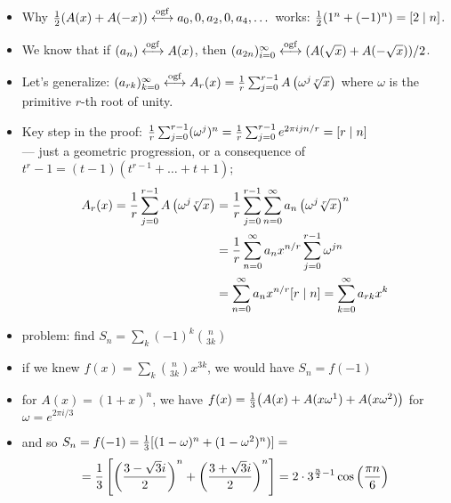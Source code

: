 \documentclass[10pt, a4paper]{article}
\newcommand*\ruleline[1]{\par\noindent\raisebox{.8ex}{\makebox[\linewidth]{\hrulefill\hspace{1ex}\raisebox{-.8ex}{#1}\hspace{1ex}\hrulefill}}}
\def\ogf{\overset{{\rm ogf}}{\longleftrightarrow}}
\begin{document}
\ruleline{Every third binomial coefficient [Wilf 51, example 4]}
\begin{itemize}
    \item Why ${1\over 2}(A(x)+A(-x))\ogf a_0, 0, a_2, 0, a_4, \dots$ works: ${1\over 2}(1^n + (-1)^n) = [2\mid n]$.
    \item We know that if $(a_n)\ogf A(x)$, then $(a_{2n})_{i=0}^\infty \ogf (A(\sqrt x) + A(-\sqrt x))/2$.
    \item Let's generalize: $(a_{rk})_{k=0}^\infty \ogf A_r(x) = \frac 1r \sum_{j=0}^{r-1} A\left(\omega^j\root r \of x\right)$
        where $\omega$ is the primitive $r$-th root of unity.
    \item Key step in the proof: ${1\over r}\sum_{j=0}^{r-1} (\omega^j)^n = {1\over r}\sum_{j=0}^{r-1} e^{2\pi ijn/r} = [r\mid n]$\\
        --- just a geometric progression, or a consequence of $t^r-1=(t-1)(t^{r-1}+\dots+t+1)$;
        \begin{align*}
            A_r(x)  = \frac 1r \sum_{j=0}^{r-1} A\left(\omega^j\root r \of x\right)
                   &= \frac 1r \sum_{j=0}^{r-1} \sum_{n=0}^\infty a_n\left(\omega^j\root r \of x\right)^n\\
                   &= \frac 1r \sum_{n=0}^\infty a_n x^{n/r} \sum_{j=0}^{r-1} \omega^{jn}\\
                   &= \sum_{n=0}^\infty a_nx^{n/r} [r\mid n] = \sum_{k=0}^\infty a_{rk} x^k
        \end{align*}
    \item problem: find $S_n = \sum_k (-1)^k{n\choose 3k}$
    \item if we knew $f(x) = \sum_k {n\choose 3k}x^{3k}$, we would have $S_n = f(-1)$
    \item for $A(x) = (1+x)^n$, we have $f(x) = {1\over 3}\big(A(x) + A(x\omega^1) + A(x\omega^2)\big)$ for $\omega=e^{2\pi i/3}$
    \item and so $S_n=f(-1) ={1\over 3}[(1-\omega)^n + (1-\omega^2)^n)] = $ $$ = {1\over 3}\left[\left({3-\sqrt3 i\over 2}\right)^n+\left({3+\sqrt3 i\over 2}\right)^n\right] = 2\cdot 3^{{n\over 2}-1}\cos\left({\pi n\over 6}\right)$$
\end{itemize}

\ruleline{Mutually recursive sequences [Knuth 343, Example 3]}
\end{document}
